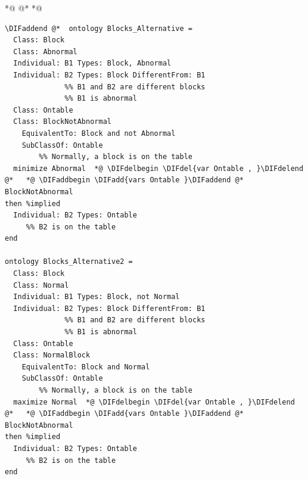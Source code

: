 \documentclass[10pt,fleqn,final]{scrreprt}
\providecommand{\DIFadd}[1]{{\protect\color{blue}\uwave{#1}}} %
\providecommand{\DIFdel}[1]{{\protect\color{red}\sout{#1}}}                      %
\providecommand{\DIFaddbegin}{} %
\providecommand{\DIFaddend}{} %
\providecommand{\DIFdelbegin}{} %
\providecommand{\DIFdelend}{} %
\begin{document}
 *@ \DIFdelbegin %
\DIFdelend @*   *@ \DIFaddbegin \begin{lstlisting}[language=dolText,alsolanguage=OWL2manchester]
\DIFaddend @*  ontology Blocks_Alternative =
  Class: Block
  Class: Abnormal
  Individual: B1 Types: Block, Abnormal
  Individual: B2 Types: Block DifferentFrom: B1
              %% B1 and B2 are different blocks
              %% B1 is abnormal
  Class: Ontable 
  Class: BlockNotAbnormal 
  	EquivalentTo: Block and not Abnormal 
	SubClassOf: Ontable 
        %% Normally, a block is on the table
  minimize Abnormal  *@ \DIFdelbegin \DIFdel{var Ontable , }\DIFdelend @*   *@ \DIFaddbegin \DIFadd{vars Ontable }\DIFaddend @*  BlockNotAbnormal
then %implied
  Individual: B2 Types: Ontable
     %% B2 is on the table
end

ontology Blocks_Alternative2 =
  Class: Block
  Class: Normal
  Individual: B1 Types: Block, not Normal
  Individual: B2 Types: Block DifferentFrom: B1
              %% B1 and B2 are different blocks
              %% B1 is abnormal
  Class: Ontable 
  Class: NormalBlock
  	EquivalentTo: Block and Normal 
	SubClassOf: Ontable 
        %% Normally, a block is on the table
  maximize Normal  *@ \DIFdelbegin \DIFdel{var Ontable , }\DIFdelend @*   *@ \DIFaddbegin \DIFadd{vars Ontable }\DIFaddend @*  BlockNotAbnormal
then %implied
  Individual: B2 Types: Ontable
     %% B2 is on the table
end
\end{lstlisting}
\end{document}
